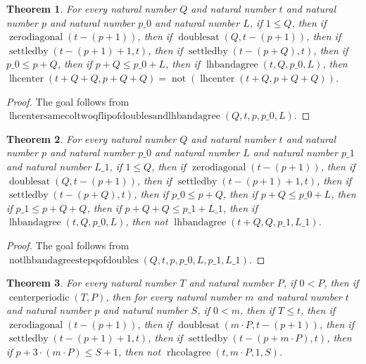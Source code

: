 \documentclass[11pt]{article}
\newtheorem{theorem}{Theorem}[section]
\theoremstyle{definition}
\begin{document}
\begin{theorem}
\label{ll:paper:lhcenter-same-col-two-q-flip-of-doubles-and-lhbandagree}
For every natural number \(Q\) and natural number \(t\) and natural number \(p\) and natural number \(p\_0\) and natural number \(L\), if \(1 \le Q\), then if \(\operatorname{zerodiagonal}(t - (p + 1))\), then if \(\operatorname{doublesat}(Q, t - (p + 1))\), then if \(\operatorname{settledby}(t - (p + 1) + 1, t)\), then if \(\operatorname{settledby}(t - (p + Q), t)\), then if \(p\_0 \le p + Q\), then if \(p + Q \le p\_0 + L\), then if \(\operatorname{lhbandagree}(t, Q, p\_0, L)\), then \(\operatorname{lhcenter}(t + Q + Q, p + Q + Q) = \operatorname{not}(\operatorname{lhcenter}(t + Q, p + Q + Q))\).
\end{theorem}
\begin{proof}
The goal follows from \(\operatorname{lhcentersamecoltwoqflipofdoublesandlhbandagree}(Q, t, p, p\_0, L)\).
\end{proof}
\begin{theorem}
\label{ll:paper:not-lhbandagree-step-q-of-doubles}
For every natural number \(Q\) and natural number \(t\) and natural number \(p\) and natural number \(p\_0\) and natural number \(L\) and natural number \(p\_1\) and natural number \(L\_1\), if \(1 \le Q\), then if \(\operatorname{zerodiagonal}(t - (p + 1))\), then if \(\operatorname{doublesat}(Q, t - (p + 1))\), then if \(\operatorname{settledby}(t - (p + 1) + 1, t)\), then if \(\operatorname{settledby}(t - (p + Q), t)\), then if \(p\_0 \le p + Q\), then if \(p + Q \le p\_0 + L\), then if \(p\_1 \le p + Q + Q\), then if \(p + Q + Q \le p\_1 + L\_1\), then if \(\operatorname{lhbandagree}(t, Q, p\_0, L)\), then not \(\operatorname{lhbandagree}(t + Q, Q, p\_1, L\_1)\).
\end{theorem}
\begin{proof}
The goal follows from \(\operatorname{notlhbandagreestepqofdoubles}(Q, t, p, p\_0, L, p\_1, L\_1)\).
\end{proof}
\begin{theorem}
\label{ll:paper:not-periodic-rhcolagree-one-of-doubles}
For every natural number \(T\) and natural number \(P\), if \(0 < P\), then if \(\operatorname{centerperiodic}(T, P)\), then for every natural number \(m\) and natural number \(t\) and natural number \(p\) and natural number \(S\), if \(0 < m\), then if \(T \le t\), then if \(\operatorname{zerodiagonal}(t - (p + 1))\), then if \(\operatorname{doublesat}(m \cdot P, t - (p + 1))\), then if \(\operatorname{settledby}(t - (p + 1) + 1, t)\), then if \(\operatorname{settledby}(t - (p + m \cdot P), t)\), then if \(p + 3 \cdot (m \cdot P) \le S + 1\), then not \(\operatorname{rhcolagree}(t, m \cdot P, 1, S)\).
\end{theorem}
\end{document}
